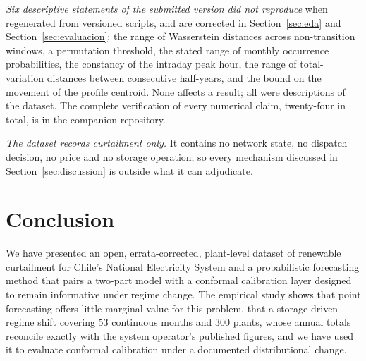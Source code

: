 \documentclass[preprint,3p,times]{elsarticle}
\providecommand{\DIFaddtex}[1]{{\protect\color{blue} \sf #1}} %
\providecommand{\DIFdeltex}[1]{{\protect\color{red} \scriptsize #1}} %
\providecommand{\DIFaddbegin}{} %
\providecommand{\DIFaddend}{} %
\providecommand{\DIFdelbegin}{} %
\providecommand{\DIFdelend}{} %
\providecommand{\DIFadd}[1]{\texorpdfstring{\DIFaddtex{#1}}{#1}} %
\providecommand{\DIFdel}[1]{\texorpdfstring{\DIFdeltex{#1}}{}} %
\begin{document}
\DIFadd{\emph{Six descriptive statements of the submitted version did not reproduce} when regenerated from versioned scripts, and are corrected in Section~\ref{sec:eda} and Section~\ref{sec:evaluacion}: the range of Wasserstein distances across non-transition windows, a permutation threshold, the stated range of monthly occurrence probabilities, the constancy of the intraday peak hour, the range of total-variation distances between consecutive half-years, and the bound on the movement of the profile centroid. None affects a result; all were descriptions of the dataset. The complete verification of every numerical claim, twenty-four in total, is in the companion repository.
}

\DIFadd{\emph{The dataset records curtailment only.} It contains no network state, no dispatch decision, no price and no storage operation, so every mechanism discussed in Section~\ref{sec:discussion} is outside what it can adjudicate.
}

\DIFaddend %
\section{Conclusion}
\label{sec:conclusion}

We have presented an open, errata-corrected, plant-level dataset of renewable curtailment \DIFdelbegin \DIFdel{for Chile's National Electricity System and a probabilistic forecasting method that pairs a two-part model with a conformal calibration layer designed to remain informative under regime change.
The empirical study shows that point forecasting offers little marginal value for this problem, that a storage-driven regime shift }\DIFdelend \DIFaddbegin \DIFadd{covering 53 continuous months and 300 plants, whose annual totals reconcile exactly with the system operator's published figures, and we have used it to evaluate conformal calibration under a documented distributional change.
}
\end{document}

